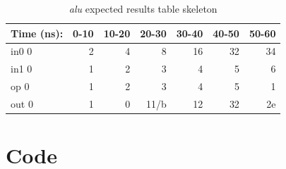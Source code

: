 \documentclass[11pt]{article}
\newcommand{\Verilog}[2][]{%
	
}
\begin{document}
\begin{table}[ht]\centering
	\caption{\textit{alu} expected results table skeleton}
	\label{ALU:tbl:alu_ERT}\medskip
	\begin{tabular}{l|rrrrrr}
		Time (ns): & 0-10 & 10-20 & 20-30 & 30-40 & 40-50 & 50-60 \\
		\midrule
		in0 0 & 2 & 4 & 8 & 16 & 32 & 34 \\
		in1 0 & 1 & 2 & 3 & 4 & 5 & 6 \\
		op	0 & 1 & 2 & 3 & 4 & 5 & 1 \\
		\midrule
		out 0 & 1 & 0 & 11/b & 12 & 32 & 2e \\
		\bottomrule
	\end{tabular}
\end{table}



\section*{Code}


\Verilog[caption= register code]{C:/Users/spencer_stinson1/Documents/GitHub/Lab09/Lab_09/Lab_09.srcs/sources_1/new/register.sv}

\Verilog[caption = register testbench code ]{C:/Users/spencer_stinson1/Documents/GitHub/Lab09/Lab_09/Lab_09.srcs/sim_1/new/register_testbench.sv}

\Verilog[caption= alu code]{C:/Users/spencer_stinson1/Documents/GitHub/Lab09/Lab_09/Lab_09.srcs/sources_1/new/alu.sv}

\Verilog[caption = alu testbench code]{C:/Users/spencer_stinson1/Documents/GitHub/Lab09/Lab_09/Lab_09.srcs/sim_2/new/alu_testbench.sv}

\Verilog[caption= top lab9 code]{C:/Users/spencer_stinson1/Documents/GitHub/Lab09/Lab_09/Lab_09.srcs/sources_1/new/top_lab9.sv}
\end{document}
